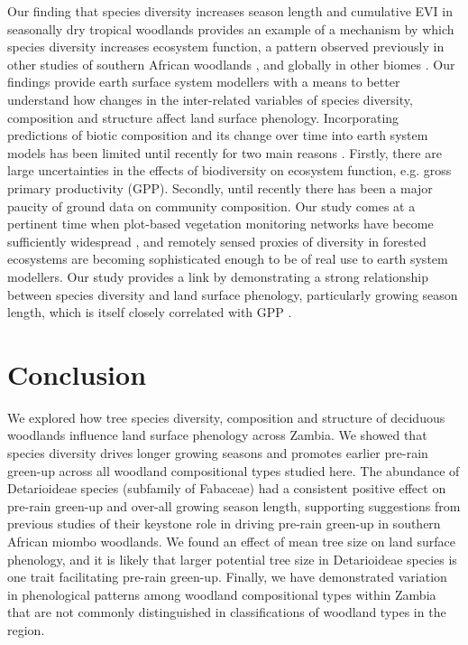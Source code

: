\documentclass[11pt,a4paper]{article}
\begin{document}
Our finding that species diversity increases season length and cumulative EVI
in seasonally dry tropical woodlands provides an example of a mechanism by
which species diversity increases ecosystem function, a pattern observed
previously in other studies of southern African woodlands \citep{Godlee2021,
McNicol2018, Shirima2015}, and globally in other biomes \citep{Plas2019,
Tilman2014}. Our findings provide earth surface system modellers with a means
to better understand how changes in the inter-related variables of species
diversity, composition and structure affect land surface phenology.
Incorporating predictions of biotic composition and its change over time into
earth system models has been limited until recently for two main reasons
\citep{Ahlstrom2015, Bodegom2011}. Firstly, there are large uncertainties in
the effects of biodiversity on ecosystem function, e.g. gross primary
productivity (GPP). Secondly, until recently there has been a major paucity of
ground data on community composition. Our study comes at a pertinent time when
plot-based vegetation monitoring networks have become sufficiently widespread
\citep{ForestPlotsnet2021, SEOSAW2020}, and remotely sensed proxies of
diversity in forested ecosystems are becoming sophisticated enough
\citep{Schneider2017, Cavendar2020} to be of real use to earth system
modellers. Our study provides a link by demonstrating a strong relationship
between species diversity and land surface phenology, particularly growing
season length, which is itself closely correlated with GPP
\citep{Sjostrom2011}. 

\section{Conclusion}

We explored how tree species diversity, composition and structure of deciduous
woodlands influence land surface phenology across Zambia. We showed that
species diversity drives longer growing seasons and promotes earlier pre-rain
green-up across all woodland compositional types studied here. The abundance of
Detarioideae species (subfamily of Fabaceae) had a consistent positive effect
on pre-rain green-up and over-all growing season length, supporting suggestions
from previous studies of their keystone role in driving pre-rain green-up in
southern African miombo woodlands. We found an effect of mean tree size on land
surface phenology, and it is likely that larger potential tree size in
Detarioideae species is one trait facilitating pre-rain green-up. Finally, we
have demonstrated variation in phenological patterns among woodland
compositional types within Zambia that are not commonly distinguished in
classifications of woodland types in the region. 
\end{document}
